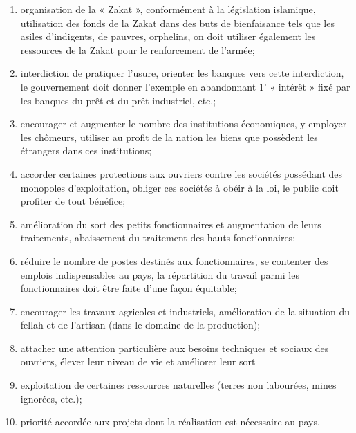 \begin{enumerate}
\def\labelenumi{\arabic{enumi})}
\item
   
  organisation de la « Zakat », conformément à la législa­tion
  islamique, utilisation des fonds de la Zakat dans des buts de
  bienfaisance tels que les asiles d'indigents, de pauvres, orphelins,
  on doit utiliser également les ressources de la Zakat pour le
  renfor­cement de l'armée;
   
\item
   
  interdiction de pratiquer l'usure, orienter les banques vers cette
  interdiction, le gouvernement doit donner l'exemple en abandonnant 1'
  « intérêt » fixé par les banques du prêt et du prêt industriel, etc.;
   
\item
   
  encourager et augmenter le nombre des institutions éco­nomiques, y
  employer les chômeurs, utiliser au profit de la nation les biens que
  possèdent les étrangers dans ces institutions;
   
\item
   
  accorder certaines protections aux ouvriers contre les sociétés
  possédant des monopoles d'exploitation, obliger ces sociétés à obéir à
  la loi, le public doit profiter de tout bénéfice;
   
\item
   
  amélioration du sort des petits fonctionnaires et augmen­tation de
  leurs traitements, abaissement du traitement des hauts fonctionnaires;
   
\item
   
  réduire le nombre de postes destinés aux fonctionnaires, se contenter
  des emplois indispensables au pays, la répartition du travail parmi
  les fonctionnaires doit être faite d'une façon équitable;
   
\item
   
  encourager les travaux agricoles et industriels, amélio­ration de la
  situation du fellah et de l'artisan (dans le domaine de la
  production);
   
\item
   
  attacher une attention particulière aux besoins techniques et sociaux
  des ouvriers, élever leur niveau de vie et améliorer leur sort
   
\item
   
  exploitation de certaines ressources naturelles (terres non labourées,
  mines ignorées, etc.);
   
\item
   
  priorité accordée aux projets dont la réalisation est nécessaire au
  pays.
   
\end{enumerate}

